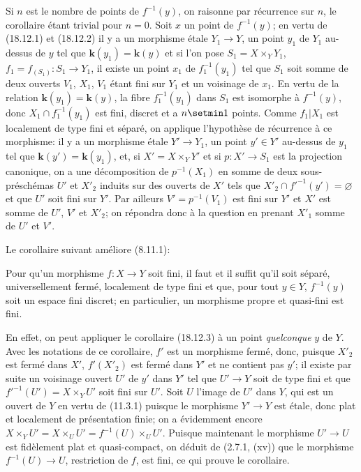 Si $n$ est le nombre de points de $f^{-1}(y)$, on raisonne par récurrence sur $n$, le corollaire étant trivial pour $n=0$. Soit $x$ un point de $f^{-1}(y)$; en vertu de (18.12.1) et (18.12.2) il y a un morphisme étale $Y_1\to Y$, un point $y_1$ de $Y_1$ au-dessus de $y$ tel que $\boldsymbol{k}(y_1)=\boldsymbol{k}(y)$ et si l'on pose $S_1=X\times_Y Y_1$, $f_1=f_{(S_1)}:S_1\to Y_1$, il existe un point $x_1$ de $f_1^{-1}(y_1)$
tel que $S_1$ soit somme de deux ouverts $V_1$, $X_1$, $V_1$ étant fini sur $Y_1$ et un voisinage de $x_1$. En vertu de la relation $\boldsymbol{k}(y_1)=\boldsymbol{k}(y)$, la fibre $f_1^{-1}(y_1)$ dans $S_1$ est isomorphe à $f^{-1}(y)$, donc $X_1\cap f_1^{-1}(y_1)$ est fini, discret et a $n\setmin 1$ points. Comme $f_1|X_1$ est localement de type fini et séparé, on applique l'hypothèse de récurrence à ce morphisme: il y a un morphisme étale $Y'\to Y_1$, un point $y'\in Y'$ au-dessus de $y_1$ tel que $\boldsymbol{k}(y')=\boldsymbol{k}(y_1)$, et, si $X'=X\times_Y Y'$ et si $p:X'\to S_1$ est la projection canonique, on a une décomposition de $p^{-1}(X_1)$ en somme de deux sous-préschémas $U'$ et $X'_2$ induits sur des ouverts de $X'$ tels que $X'_2\cap f'^{-1}(y')=\varnothing$ et que $U'$ soit fini sur $Y'$. Par ailleurs $V'=p^{-1}(V_1)$ est fini sur $Y'$ et $X'$ est somme de $U'$, $V'$ et $X'_2$; on répondra donc à la question en prenant $X'_1$ somme de $U'$ et $V'$.

Le corollaire suivant améliore (8.11.1):

\begin{corollary}[18.12.4]
\label{IV.18.12.4}
Pour qu'un morphisme $f:X\to Y$ soit fini, il faut et il suffit qu'il soit séparé, universellement fermé, localement de type fini et que, pour tout $y\in Y$, $f^{-1}(y)$ soit un espace fini discret; en particulier, un morphisme propre et quasi-fini est fini.
\end{corollary}

En effet, on peut appliquer le corollaire (18.12.3) à un point \emph{quelconque} $y$ de $Y$. Avec les notations de ce corollaire, $f'$ est un morphisme fermé, donc, puisque $X'_2$ est fermé dans $X'$, $f'(X'_2)$ est fermé dans $Y'$ et ne contient pas $y'$; il existe par suite un voisinage ouvert $U'$ de $y'$ dans $Y'$ tel que $U'\to Y$ soit de type fini et que $f'^{-1}(U')=X\times_Y U'$ soit fini sur $U'$. Soit $U$ l'image de $U'$ dans $Y$, qui est un ouvert de $Y$ en vertu de (11.3.1) puisque le morphisme $Y'\to Y$ est étale, donc plat et localement de présentation finie; on a évidemment encore $X\times_Y U'=X\times_U U'=f^{-1}(U)\times_U U'$. Puisque maintenant le morphisme $U'\to U$ est fidèlement plat et quasi-compact, on déduit de (2.7.1, (xv)) que le morphisme $f^{-1}(U)\to U$, restriction de $f$, est fini, ce qui prouve le corollaire.

